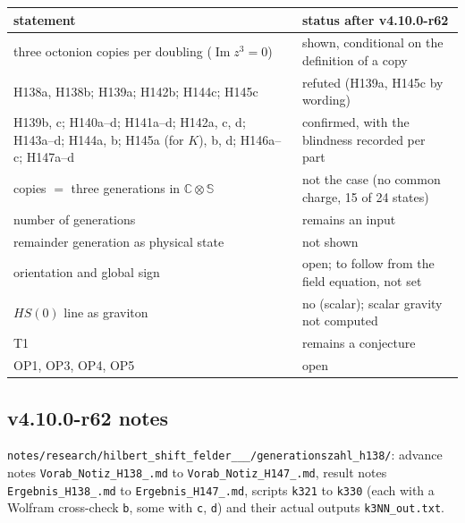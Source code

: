 \begin{center}
\small
\begin{tabular}{@{}>{\raggedright\arraybackslash}p{}>{\raggedright\arraybackslash}p{}@{}}
\toprule
statement & status after v4.10.0-r62\\
\midrule
three octonion copies per doubling (\(\operatorname{Im}z^3=0\)) & shown, conditional on the definition of a copy\\
H138a, H138b; H139a; H142b; H144c; H145c & refuted (H139a, H145c by wording)\\
H139b, c; H140a--d; H141a--d; H142a, c, d; H143a--d; H144a, b; H145a (for \(K\)), b, d; H146a--c; H147a--d & confirmed, with the blindness recorded per part\\
copies \(=\) three generations in \(\mathbb C\otimes\mathbb S\) & not the case (no common charge, 15 of 24 states)\\
number of generations & remains an input\\
remainder generation as physical state & not shown\\
orientation and global sign & open; to follow from the field equation, not set\\
\(HS(0)\) line as graviton & no (scalar); scalar gravity not computed\\
T1 & remains a conjecture\\
OP1, OP3, OP4, OP5 & open\\
\bottomrule
\end{tabular}
\end{center}

\subsection*{v4.10.0-r62 notes}
\label{subsec:v4100-r62-notes}

{\raggedright
\texttt{notes/\allowbreak research/\allowbreak hilbert\_\allowbreak shift\_\allowbreak felder\_\_\_/\allowbreak generationszahl\_\allowbreak h138/}:
advance notes \texttt{Vorab\_\allowbreak Notiz\_\allowbreak H138\_\allowbreak *.md} to \texttt{Vorab\_\allowbreak Notiz\_\allowbreak H147\_\allowbreak *.md}, result notes
\texttt{Ergebnis\_\allowbreak H138\_\allowbreak *.md} to \texttt{Ergebnis\_\allowbreak H147\_\allowbreak *.md}, scripts \texttt{k321} to \texttt{k330} (each with a
Wolfram cross-check \texttt{b}, some with \texttt{c}, \texttt{d}) and their actual outputs \texttt{k3NN\_\allowbreak out.txt}.
\par}

